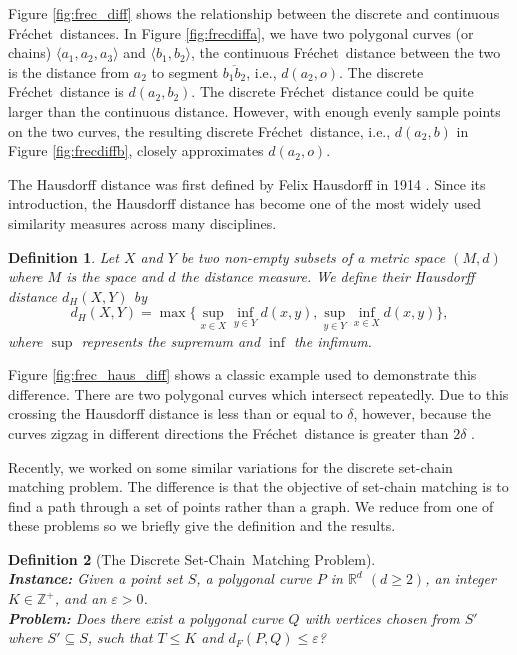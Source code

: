 \documentclass{article}[11pt]
\newcommand{\frechet}{Fr\'echet}
\newcommand{\dfre}{d_F}
\newcommand{\dhaus}{d_H}
\newcommand{\dist}{\mathit{d}}
\newcommand{\SCM}{Set-Chain}
\newtheorem{definition}{Definition}
\begin{document}
Figure \ref{fig:frec_diff} shows the relationship between the discrete and continuous
\frechet\ distances. In Figure \ref{fig:frecdiffa}, we have two polygonal curves (or chains) 
$\langle a_1, a_2, a_3 \rangle$ and $\langle b_1, b_2 \rangle$, 
the continuous \frechet\ distance between the two is the distance
from $a_2$ to segment $\overline{b_1b_2}$, i.e., $\dist(a_2,o)$. The discrete \frechet\
distance is $\dist(a_2,b_2)$. The discrete \frechet\ distance could be
quite larger than the continuous distance.
However, with enough evenly sample points on the two curves, the resulting
discrete \frechet\ distance, i.e., $\dist(a_2,b)$ in Figure \ref{fig:frecdiffb}, 
closely approximates $\dist(a_2,o)$.


The Hausdorff distance was first defined by Felix Hausdorff in 1914 \cite{Hausdorff:1914:BOOK}.
Since its introduction, the Hausdorff distance has become one of the most widely used 
similarity measures across many disciplines.

\begin{definition} \label{def:hausdorff}
    Let $X$ and $Y$ be two non-empty subsets of a metric space $(M,d)$ where $M$ is the space and $d$ the distance measure. 
    We define their Hausdorff distance $\dhaus(X, Y)$ by
    \[
     \dhaus(X,Y) = \max \{\sup_{x \in X} \inf_{y \in Y} d(x,y), \sup_{y \in Y} \inf_{x \in X} \dist(x,y) \},
    \]
    where $\sup$ represents the supremum and $\inf$ the infimum.
\end{definition}

Figure \ref{fig:frec_haus_diff}
shows a classic example used to demonstrate this difference.  There are two polygonal 
curves which intersect repeatedly.  Due to this crossing the Hausdorff distance is
less than or equal to $\delta$, however, because the curves zigzag in different directions
the \frechet\ distance is greater than $2\delta$ \cite{Alt:1995:JCOMPS}.  



Recently, we worked on some similar variations for the discrete set-chain matching problem.  The difference
is that the objective of set-chain matching is to find a path through a set of points rather than a graph.  
We reduce from one of these problems so we briefly give the definition and the results.

\begin{definition}[The Discrete \SCM\ Matching Problem]\hfill \\
    \noindent
    {\bf Instance:}
    Given a point set $S$, a polygonal curve $P$ in $\mathbb{R}^d$ $(d \geq 2)$, an integer $K \in \mathbb{Z}^+$,  
    and an $\varepsilon > 0$. \\
    {\bf Problem:}
    Does there exist a polygonal curve $Q$ with vertices chosen from $S'$ 
    where $S' \subseteq S$, such that $T \leq K$ and $\dfre(P,Q) \leq \varepsilon$?
\end{definition}
\end{document}
